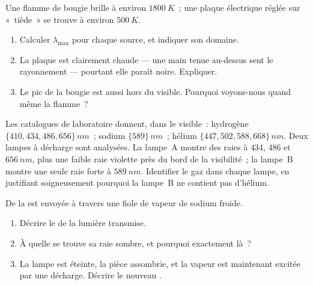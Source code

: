\begin{exercise}[$\star\star$]\label{exo:g10:light-spectra:7}
Une flamme de bougie brille à environ $\qty{1800}{K}$~; une plaque
électrique réglée sur «~tiède~» se trouve à environ $\qty{500}{K}$.
\begin{enumerate}
  \item Calculer $\lambda_{\max}$ pour chaque source, et indiquer son
        domaine.
  \item La plaque est clairement chaude --- une main tenue au-dessus
        sent le rayonnement --- pourtant elle paraît noire. Expliquer.
  \item Le pic de la bougie est aussi hors du visible. Pourquoi
        voyons-nous quand même la flamme~?
\end{enumerate}
\end{exercise}

\begin{exercise}[$\star\star$]\label{exo:g10:light-spectra:8}
Les catalogues de laboratoire donnent, dans le visible~: hydrogène
$\{410, 434, 486, 656\}\,\unit{nm}$~; sodium $\{589\}\,\unit{nm}$~;
hélium $\{447, 502, 588, 668\}\,\unit{nm}$. Deux lampes à décharge sont
analysées. La lampe~A montre des raies à $434$, $486$ et
$\qty{656}{nm}$, plus une faible raie violette près du bord de la
visibilité~; la lampe~B montre une seule raie forte à $\qty{589}{nm}$.
Identifier le gaz dans chaque lampe, en justifiant soigneusement
pourquoi la lampe~B ne contient pas d'hélium.
\end{exercise}

\begin{exercise}[$\star\star$]\label{exo:g10:light-spectra:9}
De la  est envoyée à travers une fiole de vapeur de
sodium froide.
\begin{enumerate}
  \item Décrire le  de la lumière transmise.
  \item À quelle  se trouve sa raie sombre, et
        pourquoi exactement là~?
  \item La lampe est éteinte, la pièce assombrie, et la vapeur est
        maintenant excitée par une décharge. Décrire le nouveau
        .
\end{enumerate}
\end{exercise}

